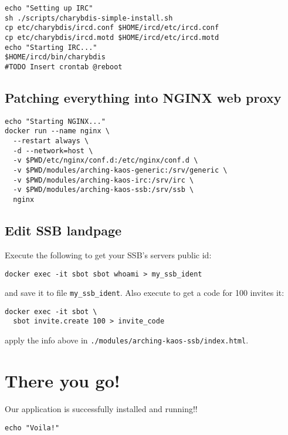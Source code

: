 \documentclass[12pt]{report}
\begin{document}
\begin{verbatim}
echo "Setting up IRC"
sh ./scripts/charybdis-simple-install.sh
cp etc/charybdis/ircd.conf $HOME/ircd/etc/ircd.conf
cp etc/charybdis/ircd.motd $HOME/ircd/etc/ircd.motd
echo "Starting IRC..."
$HOME/ircd/bin/charybdis
#TODO Insert crontab @reboot
\end{verbatim}


\subsection{Patching everything into NGINX web
proxy}\label{patching-everything-into-nginx-web-proxy}

\begin{verbatim}
echo "Starting NGINX..."
docker run --name nginx \
  --restart always \
  -d --network=host \
  -v $PWD/etc/nginx/conf.d:/etc/nginx/conf.d \
  -v $PWD/modules/arching-kaos-generic:/srv/generic \
  -v $PWD/modules/arching-kaos-irc:/srv/irc \
  -v $PWD/modules/arching-kaos-ssb:/srv/ssb \
  nginx
\end{verbatim}


\subsection{Edit SSB landpage}\label{edit-ssb-landpage}

Execute the following to get your SSB's servers public id:
\begin{verbatim}
docker exec -it sbot sbot whoami > my_ssb_ident
\end{verbatim}

and save it to file \texttt{my\_ssb\_ident}. Also execute to get a code
for 100 invites it:
\begin{verbatim}
docker exec -it sbot \
  sbot invite.create 100 > invite_code
\end{verbatim}
apply the info above in \texttt{./modules/arching-kaos-ssb/index.html}.


\section{There you go!}\label{there-you-go}

Our application is successfully installed and running!!

\begin{verbatim}
echo "Voila!"
\end{verbatim}
\end{document}
